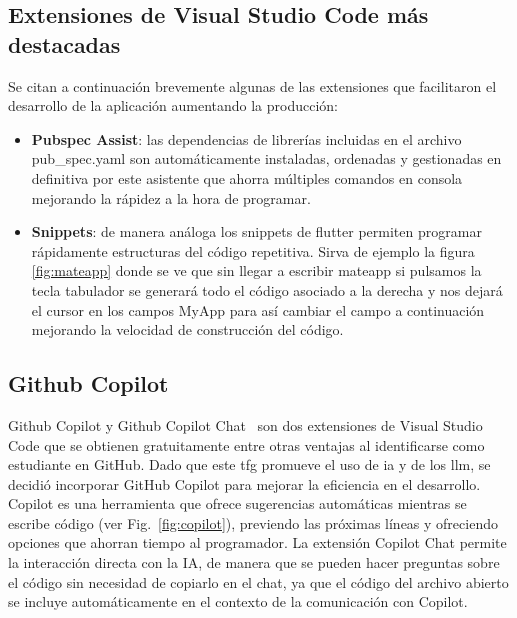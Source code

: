 	\subsection{Extensiones de Visual Studio Code más destacadas}
		Se citan a continuación brevemente algunas de las extensiones que facilitaron el desarrollo de la aplicación aumentando la producción:
		\begin{itemize}
		
		\item \textbf{Pubspec Assist}: las dependencias de librerías incluidas en el archivo pub\_spec.yaml son automáticamente instaladas, ordenadas y gestionadas en definitiva por este asistente que ahorra múltiples comandos en consola mejorando la rápidez a la hora de programar.
		
		\item \textbf{Snippets}: de manera análoga los snippets de flutter permiten programar rápidamente estructuras del código repetitiva. 
		Sirva de ejemplo la figura \ref{fig:mateapp} donde se ve que sin llegar a escribir mateapp si pulsamos la tecla tabulador se generará todo el código asociado a la derecha y nos dejará el cursor en los campos MyApp para así cambiar el campo a continuación mejorando la velocidad de construcción del código.		
		\end{itemize}

	\subsection{Github Copilot}
	Github Copilot y Github Copilot Chat~\cite{vscode_copilot} son dos extensiones de Visual Studio Code que se obtienen gratuitamente entre otras ventajas al identificarse como estudiante en GitHub. Dado que este \acrshort{tfg} promueve el uso de \acrfull{ia} y de los \acrshort{llm}, se decidió incorporar GitHub Copilot para mejorar la eficiencia en el desarrollo.
	Copilot es una herramienta que ofrece sugerencias automáticas mientras se escribe código (ver Fig.~\ref{fig:copilot}), previendo las próximas líneas y ofreciendo opciones que ahorran tiempo al programador.
	La extensión Copilot Chat permite la interacción directa con la IA, de manera que se pueden hacer preguntas sobre el código sin necesidad de copiarlo en el chat, ya que el código del archivo abierto se incluye automáticamente en el contexto de la comunicación con Copilot.
	
	

